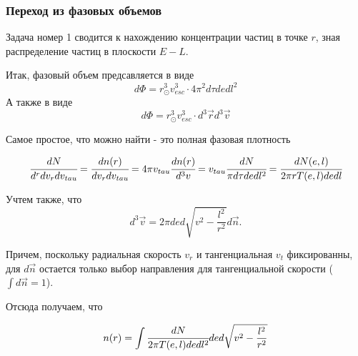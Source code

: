 	
	\subsubsection{Переход из фазовых объемов}
	Задача номер 1 сводится к нахождению концентрации частиц в точке $r$, зная распределение частиц в плоскости $E-L$.
	
	Итак, фазовый объем предсавляется в виде
	\begin{equation}
		\label{eq:phase_volume_nd}
		d\Phi = r_{\odot}^3v_{esc}^3 \cdot 4\pi^{2} d\tau de dl^2
	\end{equation}
	А также в виде
	\begin{equation}
		d\Phi = r_{\odot}^3v_{esc}^3 \cdot d^3\vec{r}d^3\vec{v}
	\end{equation}
	
	Самое простое, что можно найти - это полная фазовая плотность
	
	\begin{equation*}
		\cfrac{dN}{d^r dv_r dv_{tau}} = 
		\cfrac{dn(r)}{dv_r dv_{tau}} = 
		4\pi v_{tau}\cfrac{dn(r)}{d^3v} = 
		v_{tau}\cfrac{dN}{\pi d\tau de dl^2} = 
		\cfrac{dN(e,l)}{2\pi r T(e,l) de dl}
	\end{equation*}
	
	Учтем также, что
	\begin{equation}
		\label{eq:velocity_dens}
		d^{3}\vec{v}  = 2\pi ded\sqrt{v^2-\frac{l^2}{r^2}} d\vec{n}.
	\end{equation}
	 
	 Причем, поскольку радиальная скорость $v_r$ и тангенциальная $v_{t}$ фиксированны, для $d\vec{n}$ остается только выбор направления для тангенциальной скорости ($\int{d\vec{n}} = 1$).
	 
	 Отсюда получаем, что
	 
	 \begin{equation}
	 	n(r) = \int{ \cfrac{dN}{2\pi T(e,l) de dl^2} de d\sqrt{v^2-\frac{l^2}{r^2}}}
	 \end{equation}
	 

